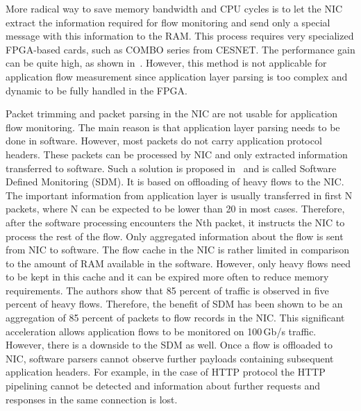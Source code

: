 More radical way to save memory bandwidth and CPU cycles is to let the NIC extract the information required for flow monitoring and send only a special message with this information to the RAM. This process requires very specialized FPGA-based cards, such as COMBO series from CESNET. The performance gain can be quite high, as shown in~\cite{Velan-2015-High}. However, this method is not applicable for application flow measurement since application layer parsing is too complex and dynamic to be fully handled in the FPGA.

Packet trimming and packet parsing in the NIC are not usable for application flow monitoring. The main reason is that application layer parsing needs to be done in software. However, most packets do not carry application protocol headers. These packets can be processed by NIC and only extracted information transferred to software. Such a solution is proposed in~\cite{Kekely-2016-Software} and is called Software Defined Monitoring (SDM). It is based on offloading of heavy flows to the NIC. The important information from application layer is usually transferred in first N packets, where N can be expected to be lower than 20 in most cases. Therefore, after the software processing encounters the Nth packet, it instructs the NIC to process the rest of the flow. Only aggregated information about the flow is sent from NIC to software. The flow cache in the NIC is rather limited in comparison to the amount of RAM available in the software. However, only heavy flows need to be kept in this cache and it can be expired more often to reduce memory requirements. The authors show that 85 percent of traffic is observed in five percent of heavy flows. Therefore, the benefit of SDM has been shown to be an aggregation of 85 percent of packets to flow records in the NIC. This significant acceleration allows application flows to be monitored on 100\,Gb/s traffic. However, there is a downside to the SDM as well. Once a flow is offloaded to NIC, software parsers cannot observe further payloads containing subsequent application headers. For example, in the case of HTTP protocol the HTTP pipelining cannot be detected and information about further requests and responses in the same connection is lost.


